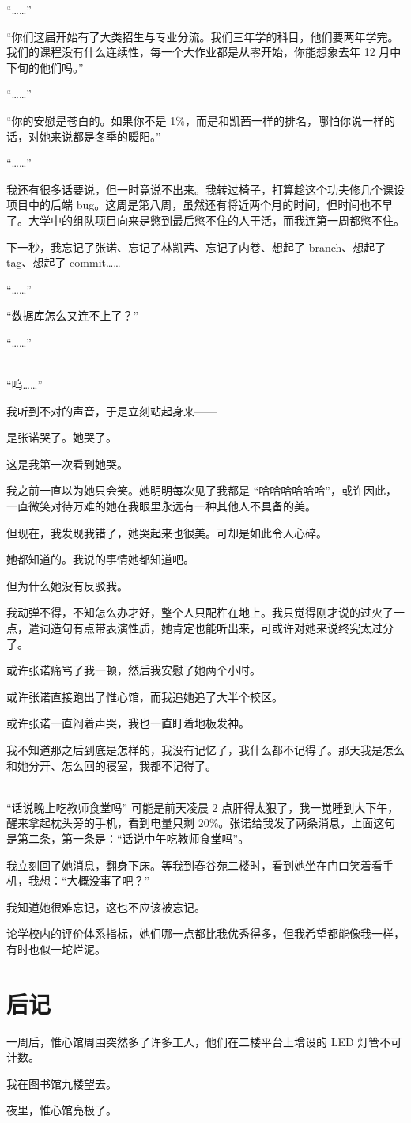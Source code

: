 \documentclass[UTF8]{ctexart}
\begin{document}
“……”

“你们这届开始有了大类招生与专业分流。我们三年学的科目，他们要两年学完。我们的课程没有什么连续性，每一个大作业都是从零开始，你能想象去年 12 月中下旬的他们吗。”

“……”

“你的安慰是苍白的。如果你不是 1\%，而是和凯茜一样的排名，哪怕你说一样的话，对她来说都是冬季的暖阳。”

“……”

我还有很多话要说，但一时竟说不出来。我转过椅子，打算趁这个功夫修几个课设项目中的后端 bug。这周是第八周，虽然还有将近两个月的时间，但时间也不早了。大学中的组队项目向来是憋到最后憋不住的人干活，而我连第一周都憋不住。

下一秒，我忘记了张诺、忘记了林凯茜、忘记了内卷、想起了 branch、想起了 tag、想起了 commit……

“……”

“数据库怎么又连不上了？”

“……”

~\\

“呜……”

我听到不对的声音，于是立刻站起身来——

是张诺哭了。她哭了。

这是我第一次看到她哭。

我之前一直以为她只会笑。她明明每次见了我都是 “哈哈哈哈哈哈”，或许因此，一直微笑对待万难的她在我眼里永远有一种其他人不具备的美。

但现在，我发现我错了，她哭起来也很美。可却是如此令人心碎。

她都知道的。我说的事情她都知道吧。

但为什么她没有反驳我。

我动弹不得，不知怎么办才好，整个人只配杵在地上。我只觉得刚才说的过火了一点，遣词造句有点带表演性质，她肯定也能听出来，可或许对她来说终究太过分了。

或许张诺痛骂了我一顿，然后我安慰了她两个小时。

或许张诺直接跑出了惟心馆，而我追她追了大半个校区。

或许张诺一直闷着声哭，我也一直盯着地板发神。

我不知道那之后到底是怎样的，我没有记忆了，我什么都不记得了。那天我是怎么和她分开、怎么回的寝室，我都不记得了。

~\\

“话说晚上吃教师食堂吗” 可能是前天凌晨 2 点肝得太狠了，我一觉睡到大下午，醒来拿起枕头旁的手机，看到电量只剩 20\%。张诺给我发了两条消息，上面这句是第二条，第一条是：“话说中午吃教师食堂吗”。

我立刻回了她消息，翻身下床。等我到春谷苑二楼时，看到她坐在门口笑着看手机，我想：“大概没事了吧？”

我知道她很难忘记，这也不应该被忘记。

论学校内的评价体系指标，她们哪一点都比我优秀得多，但我希望都能像我一样，有时也似一坨烂泥。

\section{后记}

一周后，惟心馆周围突然多了许多工人，他们在二楼平台上增设的 LED 灯管不可计数。

我在图书馆九楼望去。

夜里，惟心馆亮极了。
\end{document}

